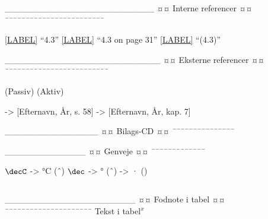 
________________________
¤¤ Interne referencer ¤¤
¯¯¯¯¯¯¯¯¯¯¯¯¯¯¯¯¯¯¯¯¯¯¯¯

\ref{LABEL} 		“4.3”
\vref{LABEL} 		“4.3 on page 31”
\eqref{LABEL} 		“(4.3)”

_________________________
¤¤ Eksterne referencer ¤¤
¯¯¯¯¯¯¯¯¯¯¯¯¯¯¯¯¯¯¯¯¯¯¯¯¯

\citep{LABEL} 		(Passiv)
\citet{LABEL} 		(Aktiv)

\citep[ SIDE, AFSNIT, KAPITEL MV.]{LABEL}

\citep[ s. 58]{fysikbog} 		->		[Efternavn, År, s. 58]
\citep[ kap. 7]{fysikbog} 		->		[Efternavn, År, kap. 7]


_______________
¤¤ Bilags-CD ¤¤
¯¯¯¯¯¯¯¯¯¯¯¯¯¯¯

\citep[ FILNAVN]{cd}


_____________
¤¤ Genveje ¤¤
¯¯¯¯¯¯¯¯¯¯¯¯¯

$\decC$ 		->		°C 		(ˆ{\circ})
$\dec$ 			->		° 		(ˆ{\circ})
\m 				->		· 		(\cdot)



\begin{verbatim}

\end{verbatim}

_____________________
¤¤ Fodnote i tabel ¤¤
¯¯¯¯¯¯¯¯¯¯¯¯¯¯¯¯¯¯¯¯¯
Tekst i tabel$^x$


\addtocounter{footnote}{1}
